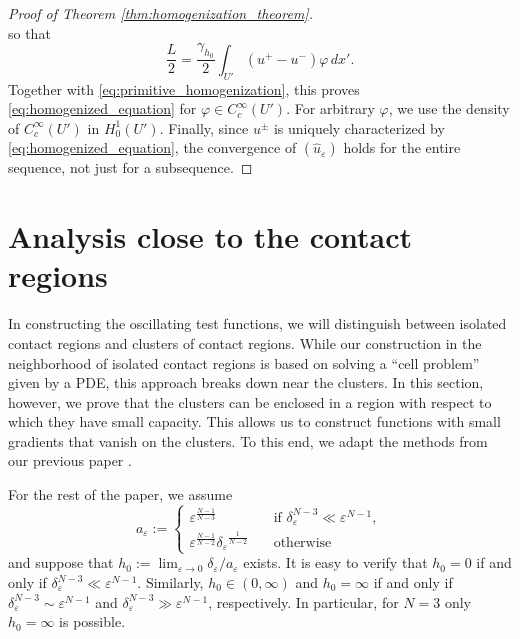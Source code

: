 \documentclass{article}
\numberwithin{equation}{section}
\theoremstyle{definition}
\theoremstyle{remark}
\begin{document}
\begin{proof}[Proof of Theorem \ref{thm:homogenization_theorem}]
\begin{equation*}
    \end{equation*}
    so that
    \[
    \frac{L}{2} = \frac{\gamma_{h_0}}{2} \int_{U'} (u^+ - u^-) \varphi \, dx'.
    \]
    Together with \eqref{eq:primitive_homogenization}, this proves \eqref{eq:homogenized_equation} for $\varphi \in C_c^\infty(U')$. For arbitrary $\varphi$, we use the density of $C_c^\infty(U')$ in $H_0^1(U')$. Finally, since $u^\pm$ is uniquely characterized by \eqref{eq:homogenized_equation}, the convergence of $(\hat{u}_\varepsilon)$ holds for the entire sequence, not just for a subsequence.
\end{proof}

\section{Analysis close to the contact regions} \label{sec:perforations}

In constructing the oscillating test functions, we will distinguish between isolated contact regions and clusters of contact regions. While our construction in the neighborhood of isolated contact regions is based on solving a ``cell problem” given by a PDE, this approach breaks down near the clusters. In this section, however, we prove that the clusters can be enclosed in a region with respect to which they have small capacity. This allows us to construct functions with small gradients that vanish on the clusters. To this end, we adapt the methods from our previous paper \cite{B}. 

For the rest of the paper, we assume
\[
a_\varepsilon :=
\begin{cases}
    \varepsilon^\frac{N - 1}{N - 3} \quad &\text{if } \delta_\varepsilon^{N - 3} \ll \varepsilon^{N - 1}, \\
    \varepsilon^\frac{N - 1}{N - 2} {\delta_\varepsilon}^\frac{1}{N - 2} \quad &\text{otherwise}
\end{cases}
\]
and suppose that $h_0 := \lim_{\varepsilon \to 0} \delta_\varepsilon/a_\varepsilon$ exists. It is easy to verify that $h_0 = 0$ if and only if $\delta_\varepsilon^{N - 3} \ll \varepsilon^{N - 1}$. Similarly, $h_0 \in (0, \infty)$ and $h_0 = \infty$ if and only if $\delta_\varepsilon^{N - 3} \sim \varepsilon^{N - 1}$ and $\delta_\varepsilon^{N - 3} \gg \varepsilon^{N - 1}$, respectively. In particular, for $N = 3$ only $h_0 = \infty$ is possible.
\end{document}
